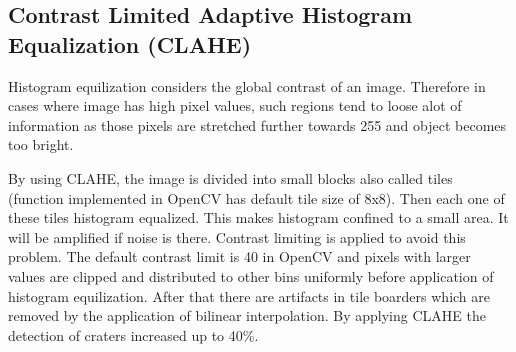 \documentclass[11pt]{article}
\begin{document}
\subsection{Contrast Limited Adaptive Histogram Equalization (CLAHE)}
Histogram equilization considers the global contrast of an image. Therefore in cases where image has high pixel values, such regions tend to loose alot of information as those pixels are stretched further towards 255 and object becomes too bright. 

By using CLAHE, the image is divided into small blocks also called tiles (function implemented in OpenCV has default tile size of 8x8). Then each one of these tiles histogram equalized. This makes histogram confined to a small area. It will be amplified if noise is there. Contrast limiting is applied to avoid this problem. The default contrast limit is 40 in OpenCV and pixels with larger values are clipped and distributed to other bins uniformly before application of histogram equilization. After that there are artifacts in tile boarders which are removed by the application of bilinear interpolation. By applying CLAHE the detection of craters increased up to 40\%. 
\end{document}
